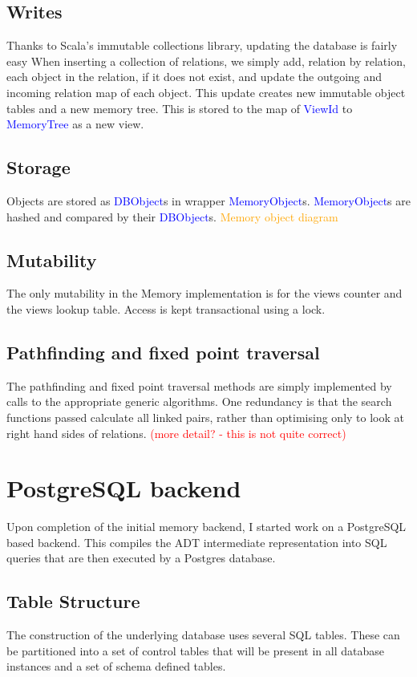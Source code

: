 \documentclass[12pt,a4paper,twoside,openright]{report}
\newcommand\todo[1]{\textcolor{red}{#1}}
\newcommand\codeName[1]{\textcolor{blue}{#1}}
\newcommand\diagramNeeded[1]{\textcolor{orange}{#1}}
\begin{document}
{{	\subsection{Writes}
	Thanks to Scala's immutable collections library, updating the database is fairly easy When inserting a collection of relations, we simply add, relation by relation, each object in the relation, if it does not exist, and update the outgoing and incoming relation map of each object. This update creates new immutable object tables and a new memory tree. This is stored to the map of \codeName{ViewId}  to \codeName{MemoryTree} as a new view.

	\subsection{Storage}
	Objects are stored as \codeName{DBObject}s in wrapper \codeName{MemoryObject}s. \codeName{MemoryObject}s  are hashed and compared by their \codeName{DBObject}s. \diagramNeeded{Memory object diagram}
	
	\subsection{Mutability}
	The only mutability in the Memory implementation is for the views counter and the views lookup table. Access is kept transactional using a lock.

	\subsection{Pathfinding and fixed point traversal}
	The pathfinding and fixed point traversal methods are simply implemented by calls to the appropriate generic algorithms. One redundancy is that the search functions passed calculate all linked pairs, rather than optimising only to look at right hand sides of relations. \todo{(more detail? - this is not quite correct)}


\section{PostgreSQL backend}
Upon completion of the initial memory backend, I started work on a PostgreSQL based backend. This compiles the ADT intermediate representation into SQL queries that are then executed by a Postgres database.

	\subsection{Table Structure}
	The construction of the underlying database uses several SQL tables. These can be partitioned into a set of control tables that will be present in all database instances and a set  of schema defined tables.

}}
\end{document}
